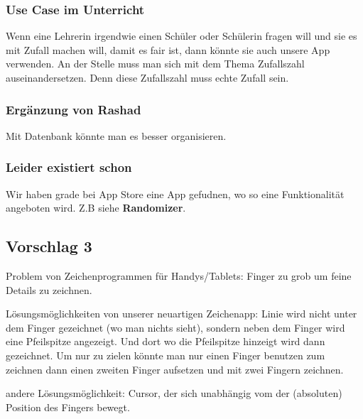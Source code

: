 \subsubsection{Use Case im Unterricht}
Wenn eine Lehrerin irgendwie einen Schüler oder Schülerin fragen will und sie es mit Zufall machen will, damit es fair ist, dann könnte sie auch unsere App verwenden. An der Stelle muss man sich mit dem Thema Zufallszahl auseinandersetzen. Denn diese Zufallszahl muss echte Zufall sein. 


\subsubsection{Ergänzung von Rashad}
Mit Datenbank könnte man es besser organisieren. 


\subsubsection{Leider existiert schon}
Wir haben grade bei App Store eine App gefudnen, wo so eine Funktionalität angeboten wird. Z.B siehe \textbf{Randomizer}. 



\subsection{Vorschlag 3}

Problem von Zeichenprogrammen für Handys/Tablets: Finger zu grob um feine Details zu zeichnen. 

Lösungsmöglichkeiten von unserer neuartigen Zeichenapp:
Linie wird nicht unter dem Finger gezeichnet (wo man nichts sieht), sondern neben dem Finger wird eine Pfeilspitze angezeigt. Und dort wo die Pfeilspitze hinzeigt wird dann gezeichnet.
Um nur zu zielen könnte man nur einen Finger benutzen zum zeichnen dann einen zweiten Finger aufsetzen und mit zwei Fingern zeichnen.

andere Lösungsmöglichkeit:
Cursor, der sich unabhängig vom der (absoluten) Position des Fingers bewegt.

